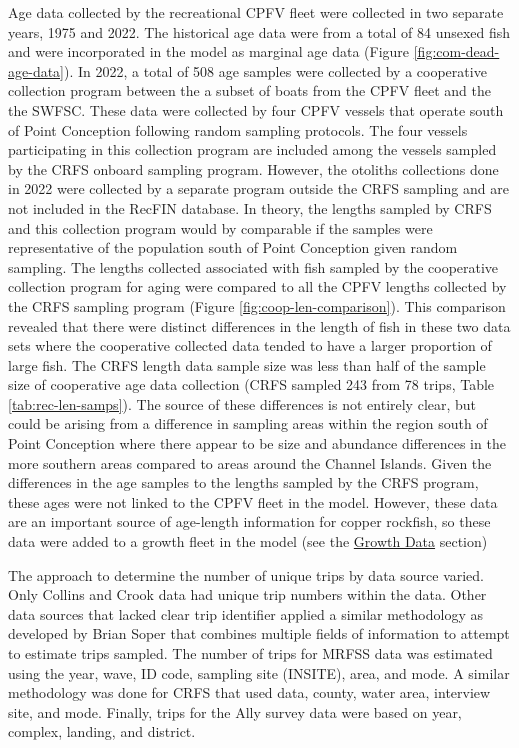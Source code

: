 \documentclass[11pt,
  english,
  letterpaper,
]{article}
\begin{document}
Age data collected by the recreational CPFV fleet were collected in two separate years, 1975 and 2022. The historical age data were from a total of 84 unsexed fish and were incorporated in the model as marginal age data (Figure \ref{fig:com-dead-age-data}). In 2022, a total of 508 age samples were collected by a cooperative collection program between the a subset of boats from the CPFV fleet and the the SWFSC. These data were collected by four CPFV vessels that operate south of Point Conception following random sampling protocols. The four vessels participating in this collection program are included among the vessels sampled by the CRFS onboard sampling program. However, the otoliths collections done in 2022 were collected by a separate program outside the CRFS sampling and are not included in the RecFIN database. In theory, the lengths sampled by CRFS and this collection program would by comparable if the samples were representative of the population south of Point Conception given random sampling. The lengths collected associated with fish sampled by the cooperative collection program for aging were compared to all the CPFV lengths collected by the CRFS sampling program (Figure \ref{fig:coop-len-comparison}). This comparison revealed that there were distinct differences in the length of fish in these two data sets where the cooperative collected data tended to have a larger proportion of large fish. The CRFS length data sample size was less than half of the sample size of cooperative age data collection (CRFS sampled 243 from 78 trips, Table \ref{tab:rec-len-samps}). The source of these differences is not entirely clear, but could be arising from a difference in sampling areas within the region south of Point Conception where there appear to be size and abundance differences in the more southern areas compared to areas around the Channel Islands. Given the differences in the age samples to the lengths sampled by the CRFS program, these ages were not linked to the CPFV fleet in the model. However, these data are an important source of age-length information for copper rockfish, so these data were added to a growth fleet in the model (see the \protect\hyperlink{growth-data}{Growth Data} section)

The approach to determine the number of unique trips by data source varied. Only Collins and Crook data had unique trip numbers within the data. Other data sources that lacked clear trip identifier applied a similar methodology as developed by Brian Soper that combines multiple fields of information to attempt to estimate trips sampled. The number of trips for MRFSS data was estimated using the year, wave, ID code, sampling site (INSITE), area, and mode. A similar methodology was done for CRFS that used data, county, water area, interview site, and mode. Finally, trips for the Ally survey data were based on year, complex, landing, and district.
\end{document}
